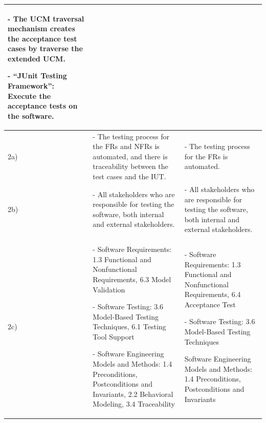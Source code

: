 \begin{landscape}
\begin{small}
\begin{table}
\begin{longtable}[h]{>{\raggedright}p{0.5cm}|>{}p{11cm}|>{}p{11cm}}
			- The UCM traversal mechanism creates the acceptance test cases by traverse the extended UCM.
			
			- \enquote{JUnit Testing Framework}: Execute the acceptance tests on the software.
			\\
			\hline %
			2a)
			& - The testing process for the FRs and NFRs is automated, and there is traceability between the test cases and the IUT. 
			& - The testing process for the FRs is automated. \\ \hline
			2b)
			& - All stakeholders who are responsible for testing the software, both internal and external stakeholders.
			& - All stakeholders who are responsible for testing the software, both internal and external stakeholders.\\ \hline
			2c)
			& - Software Requirements: 1.3 Functional and Nonfunctional Requirements, 6.3 Model Validation
			
			- Software Testing: 3.6 Model-Based Testing Techniques, 6.1 Testing Tool Support
			
			- Software Engineering Models and Methods: 1.4 Preconditions, Postconditions and Invariants, 2.2 Behavioral Modeling, 3.4 Traceability 
			&
			- Software Requirements: 1.3 Functional and Nonfunctional Requirements, 6.4 Acceptance Test
			
			- Software Testing: 3.6 Model-Based Testing Techniques
			
			Software Engineering Models and Methods: 1.4 Preconditions, Postconditions and Invariants\\
			\hline %
		\end{longtable}
		\label{tab:08_syntheseMatrix1}
	\end{table}
	\end{small}
\end{landscape}
\restoregeometry

